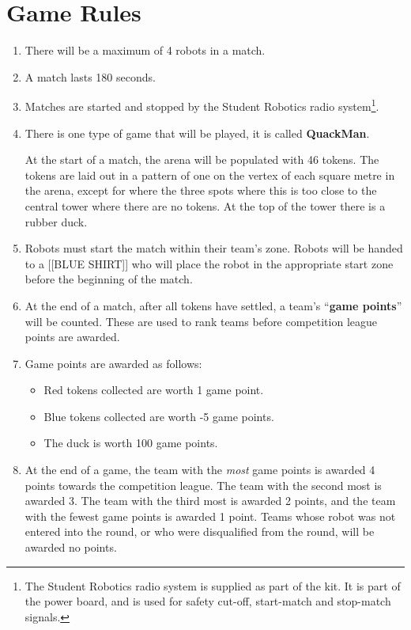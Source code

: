 \section {Game Rules}
\label{game-rules}

\begin{enumerate}
\item There will be a maximum of 4 robots in a match.
\item A match lasts 180 seconds.
\item Matches are started and stopped by the Student Robotics radio system\footnote{The Student Robotics radio system is supplied as part of the kit.
 It is part of the power board, and is used for safety cut-off, start-match and stop-match signals.}.
\item There is one type of game that will be played, it is called \textbf{QuackMan}.

At the start of a match, the arena will be populated with 46 tokens.
The tokens are laid out in a pattern of one on the vertex of each square metre in the arena, except for where the three spots where this is too close to the central tower where there are no tokens.
At the top of the tower there is a rubber duck.

\item Robots must start the match within their team's zone.
 Robots will be handed to a [[BLUE SHIRT]] who will place the robot in the appropriate start zone before the beginning of the match.

\item At the end of a match, after all tokens have settled, a team's ``\textbf{game points}'' will be counted.
 These are used to rank teams before competition league points are awarded.

\item Game points are awarded as follows:
\begin{itemize}
\item Red tokens collected are worth 1 game point.
\item Blue tokens collected are worth -5 game points.
\item The duck is worth 100 game points.
\end{itemize}

\item At the end of a game, the team with the \emph{most} game points is awarded 4 points towards the competition league.
 The team with the second most is awarded 3.
 The team with the third most is awarded 2 points, and the team with the fewest game points is awarded 1 point.
 Teams whose robot was not entered into the round, or who were disqualified from the round, will be awarded no points.

\end{enumerate}
